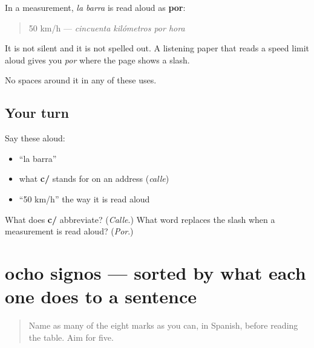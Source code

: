 \begin{grammarlens}[title={Grammar Lens: the mark that means \textquotedblleft{}per\textquotedblright{}}]
In a measurement, \emph{la barra} is read aloud as \textbf{por}:

\begin{quote}
50 km/h — \emph{cincuenta kilómetros por hora}
\end{quote}

It is not silent and it is not spelled out. A listening paper that reads a speed limit aloud gives you \emph{por} where the page shows a slash.

No spaces around it in any of these uses.
\end{grammarlens}

\subsection*{Your turn}
Say these aloud:

\begin{itemize}
\raggedright
  \item \textquotedblleft{}la barra\textquotedblright{}
  \item what \textbf{c/} stands for on an address (\emph{calle})
  \item \textquotedblleft{}50 km/h\textquotedblright{} the way it is read aloud
\end{itemize}

\begin{tcolorbox}[breakable,colback=teal!4,colframe=teal!35!black,title={Before you move on}]
What does \textbf{c/} abbreviate? (\emph{Calle}.) What word replaces the slash when a measurement is read aloud? (\emph{Por}.)
\end{tcolorbox}
\section[ocho signos]{ocho signos — sorted by what each one does to a sentence}

\label{lesson:ES-C424-repaso-signos}



\begin{quote}
Name as many of the eight marks as you can, in Spanish, before reading the table. Aim for five.
\end{quote}

